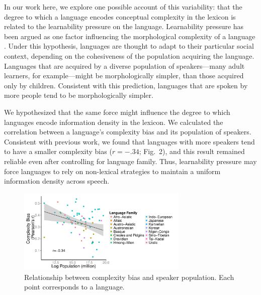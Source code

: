 \documentclass{evolang11}
\begin{document}
In our work here, we explore one possible account of this variability: that the degree to which a language encodes conceptual complexity in the lexicon is related to the learnability pressure on the language. Learnability pressure has been argued as one factor influencing the morphological complexity of a language \cite{bentz2013languages,lupyan2010language,nettle2012social}. Under this hypothesis, languages are thought to adapt to their particular social context, depending on the cohesiveness of the population acquiring the language. Languages that are  acquired by a diverse population of speakers---many adult learners, for example---might be morphologically simpler, than those acquired only by children. Consistent with this prediction, languages that are spoken by more people tend to be  morphologically simpler.

We hypothesized that the same force might influence the degree to which languages encode information density in the lexicon. We calculated the correlation between a language's complexity bias and its population of speakers. Consistent with previous work, we found that languages with more speakers tend to have a smaller complexity bias ($r = -.34$;  Fig.\ 2), and this result remained reliable even after controlling for language family. Thus, learnability pressure may force languages to rely on non-lexical strategies to maintain a uniform information density across speech.


\begin{figure}
\includegraphics[width=3.2in]{Fig2.pdf}
\caption{Relationship between complexity bias and speaker population. Each point corresponds to a language. \label{fig2}}
\end{figure}





{\footnotesize  }
\end{document}
